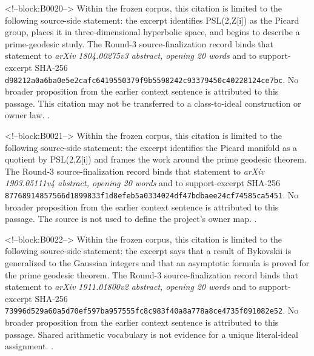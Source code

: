 \documentclass[11pt,a4paper]{article}
\begin{document}
<!--block:B0020-->
Within the frozen corpus, this citation is limited to the following source-side statement: the excerpt identifies PSL(2,Z[i]) as the Picard group, places it in three-dimensional hyperbolic space, and begins to describe a prime-geodesic study. The Round-3 source-finalization record binds that statement to \emph{arXiv 1804.00275v3 abstract, opening 20 words} and to support-excerpt SHA-256 \texttt{d98212a0\allowbreak{}a6ba0e5e\allowbreak{}2cafc641\allowbreak{}9550379f\allowbreak{}9b559824\allowbreak{}2c933794\allowbreak{}50c40228\allowbreak{}124ce7bc}. No broader proposition from the earlier context sentence is attributed to this passage. This citation may not be transferred to a class-to-ideal construction or owner law.
\citep{P29-S01}.

<!--block:B0021-->
Within the frozen corpus, this citation is limited to the following source-side statement: the excerpt identifies the Picard manifold as a quotient by PSL(2,Z[i]) and frames the work around the prime geodesic theorem. The Round-3 source-finalization record binds that statement to \emph{arXiv 1903.05111v4 abstract, opening 20 words} and to support-excerpt SHA-256 \texttt{87768914\allowbreak{}857566d1\allowbreak{}899833f1\allowbreak{}d8efeb5a\allowbreak{}0334024d\allowbreak{}f47bdbae\allowbreak{}e24cf745\allowbreak{}85ca5451}. No broader proposition from the earlier context sentence is attributed to this passage. The source is not used to define the project's owner map.
\citep{P29-S02}.

<!--block:B0022-->
Within the frozen corpus, this citation is limited to the following source-side statement: the excerpt says that a result of Bykovskii is generalized to the Gaussian integers and that an asymptotic formula is proved for the prime geodesic theorem. The Round-3 source-finalization record binds that statement to \emph{arXiv 1911.01800v2 abstract, opening 20 words} and to support-excerpt SHA-256 \texttt{73996d52\allowbreak{}9a60a5d7\allowbreak{}0ef597ba\allowbreak{}957555fc\allowbreak{}8c983f40\allowbreak{}a8a778a8\allowbreak{}ce4735f0\allowbreak{}91082e52}. No broader proposition from the earlier context sentence is attributed to this passage. Shared arithmetic vocabulary is not evidence for a unique literal-ideal assignment.
\citep{P29-S03}.
\end{document}
